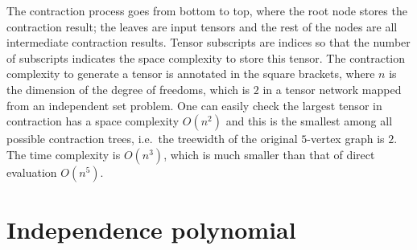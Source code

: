 \documentclass[review, onefignum, onetabnum]{siamart190516}
\begin{document}
\begin{example}
The contraction process goes from bottom to top, where the root node stores the contraction result; the leaves are input tensors and the rest of the nodes are all intermediate contraction results.
Tensor subscripts are indices so that the number of subscripts indicates the space complexity to store this tensor.
The contraction complexity to generate a tensor is annotated in the square brackets, where $n$ is the dimension of the degree of freedoms, which is $2$ in a tensor network mapped from an independent set problem.
One can easily check the largest tensor in contraction has a space complexity $O(n^2)$ and this is the smallest among all possible contraction trees, i.e.\ the treewidth of the original $5$-vertex graph is $2$. The time complexity is $O(n^3)$, which is much smaller than that of direct evaluation $O(n^5)$.
\end{example}

\section{Independence polynomial}\label{sec:indpoly}
\end{document}
